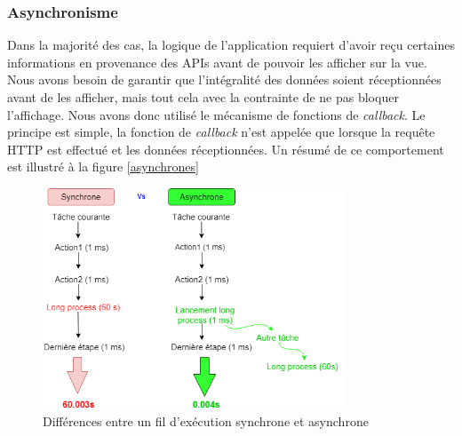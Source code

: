 \subsubsection{Asynchronisme}
Dans la majorité des cas, la logique de l'application requiert d'avoir reçu certaines informations en provenance des APIs avant de pouvoir les afficher sur la vue. Nous avons besoin de garantir que l'intégralité des données soient réceptionnées avant de les afficher, mais tout cela avec la contrainte de ne pas bloquer l'affichage.
Nous avons donc utilisé le mécanisme de fonctions de \textit{callback}. Le principe est simple, la fonction de \textit{callback} n'est appelée que lorsque la requête HTTP est effectué et les données réceptionnées. Un résumé de ce comportement est illustré à la figure \ref{asynchrones}
\begin{figure}
    \begin{center}
        \includegraphics[width=0.8\textwidth]{img/schemas/Asynchronisme2.png}
    \end{center}
    \caption{Différences entre un fil d'exécution synchrone et asynchrone}
    \label{asynchrone}
\end{figure}


